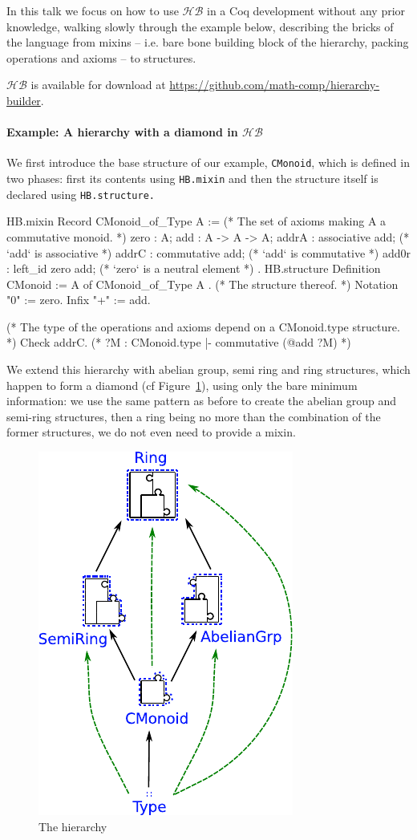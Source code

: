 \documentclass{easychair}
\newcommand{\HB}{\ensuremath{\mathcal{HB}}}
\begin{document}
In this talk we focus on how to use \HB{} in a Coq development without
any prior knowledge, walking slowly through the example below,
describing the bricks of the language from mixins -- i.e. bare bone building
block of the hierarchy, packing operations and axioms -- to structures.

\HB{} is available for download at \url{https://github.com/math-comp/hierarchy-builder}.

\paragraph{Example: A hierarchy with a diamond in \HB{}}

We first introduce the base structure of our example,
\verb-CMonoid-, which is defined in two phases: first its contents
using \verb-HB.mixin- and then the structure itself is declared using
\verb-HB.structure.-

\begin{coqcode}
HB.mixin Record CMonoid_of_Type A := { (* The set of axioms making A a commutative monoid. *)
  zero  : A; add   : A -> A -> A;
  addrA : associative add;  (* `add` is associative  *)
  addrC : commutative add;  (* `add` is commutative  *)
  add0r : left_id zero add; (* `zero` is a neutral element *)
}.
HB.structure Definition CMonoid := { A of CMonoid_of_Type A }. (* The structure thereof. *)
Notation "0" := zero.
Infix    "+" := add.

(* The type of the operations and axioms depend on a CMonoid.type structure. *)
Check addrC. (* ?M : CMonoid.type |- commutative (@add ?M) *)
\end{coqcode}

We extend this hierarchy with abelian group, semi ring and ring
structures, which happen to form a diamond (cf
Figure~\ref{fig:hierarchy}), using only the bare minimum information:
we use the same pattern as before to create the abelian group and
semi-ring structures, then a ring being no more than the combination
of the former structures, we do not even need to provide a mixin.

\begin{figure}
  \vspace{-27em}
  \includegraphics[width=.35\textwidth]{diagram.pdf}
  \vspace{-1.5em}
  \caption{The hierarchy}
  \label{fig:hierarchy}
\end{figure}
\end{document}
